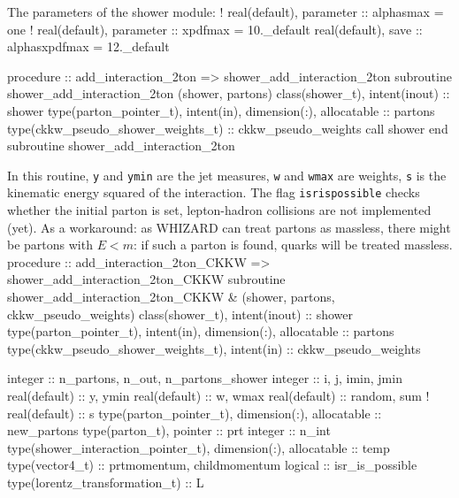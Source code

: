 \eatline
\nwendcode{}The parameters of the shower module:
\nwenddocs{}\endmoddef
  ! real(default), parameter :: alphasmax = one
  ! real(default), parameter :: xpdfmax = 10._default
  real(default), save :: alphasxpdfmax = 12._default

\eatline
\nwendcode{}\nwdocspar
\nwenddocs{}\endmoddef
  procedure :: add_interaction_2ton => shower_add_interaction_2ton
\nwendcode{}\endmoddef
  subroutine shower_add_interaction_2ton (shower, partons)
    class(shower_t), intent(inout) :: shower
    type(parton_pointer_t), intent(in), dimension(:), allocatable :: partons
    type(ckkw_pseudo_shower_weights_t) :: ckkw_pseudo_weights
    call shower%
  end subroutine shower_add_interaction_2ton

\eatline
\nwendcode{}In this routine, {\tt{}y} and {\tt{}ymin} are the jet measures, {\tt{}w} and
{\tt{}wmax} are weights, {\tt{}s} is the kinematic energy squared of the
interaction. The flag {\tt{}isr{}is{}possible} checks whether the initial
parton is set, lepton-hadron collisions are not implemented (yet). As
a workaround: as WHIZARD can treat partons as massless, there might be
partons with $E < m$: if such a parton is found, quarks will be
treated massless.
\nwenddocs{}\plusendmoddef
  procedure :: add_interaction_2ton_CKKW => shower_add_interaction_2ton_CKKW
\nwendcode{}\plusendmoddef
  subroutine shower_add_interaction_2ton_CKKW &
       (shower, partons, ckkw_pseudo_weights)
    class(shower_t), intent(inout) :: shower
    type(parton_pointer_t), intent(in), dimension(:), allocatable :: partons
    type(ckkw_pseudo_shower_weights_t), intent(in) :: ckkw_pseudo_weights

    integer :: n_partons, n_out, n_partons_shower
    integer :: i, j, imin, jmin
    real(default) :: y, ymin
    real(default) :: w, wmax
    real(default) :: random, sum
    ! real(default) :: s
    type(parton_pointer_t), dimension(:), allocatable :: new_partons
    type(parton_t), pointer :: prt
    integer :: n_int
    type(shower_interaction_pointer_t), dimension(:), allocatable :: temp
    type(vector4_t) :: prtmomentum, childmomentum
    logical :: isr_is_possible
    type(lorentz_transformation_t) :: L


